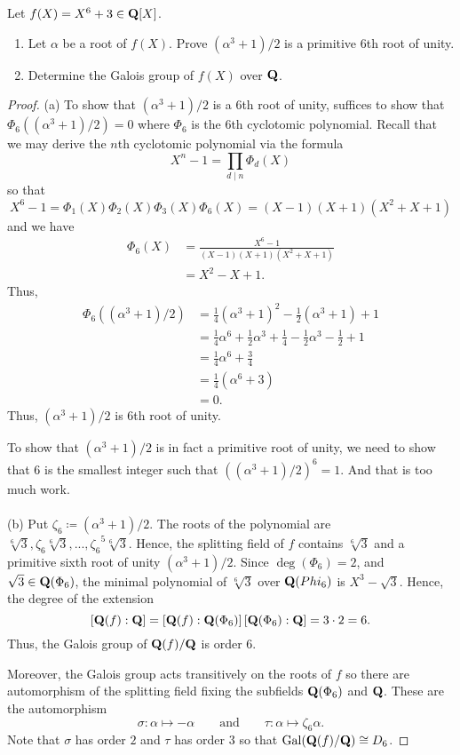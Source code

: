 \begin{problem}
Let $f(X)=X^6+3\in\mathbf{Q}[X]$.
\begin{enumerate}[label=(\alph*)]
\item Let $\alpha$ be a root of $f(X)$. Prove $(\alpha^3+1)/2$ is a
  primitive 6th root of unity.
\item Determine the Galois group of $f(X)$ over $\mathbf{Q}$.
\end{enumerate}
\end{problem}
\begin{proof}
(a) To show that $(\alpha^3+1)/2$ is a $6$th root of unity, suffices to
show that $\Phi_6((\alpha^3+1)/2)=0$ where $\Phi_6$ is the $6$th cyclotomic
polynomial. Recall that we may derive the $n$th cyclotomic polynomial via
the formula
\[
X^n-1=\prod_{d\mid n}\Phi_d(X)
\]
so that
\[
X^6-1=\Phi_1(X)\Phi_2(X)\Phi_3(X)\Phi_6(X)=(X-1)(X+1)(X^2+X+1)
\]
and we have
\begin{align*}
\Phi_6(X)&=\frac{X^6-1}{(X-1)(X+1)(X^2+X+1)}\\
         &=X^2-X+1.
\end{align*}
Thus,
\begin{align*}
\Phi_6((\alpha^3+1)/2)
&=\tfrac{1}{4}(\alpha^3+1)^2-\tfrac{1}{2}(\alpha^3+1)+1\\
&=\tfrac{1}{4}\alpha^6+\tfrac{1}{2}\alpha^3+\tfrac{1}{4}
  -\tfrac{1}{2}\alpha^3-\tfrac{1}{2}+1\\
&=\tfrac{1}{4}\alpha^6+\tfrac{3}{4}\\
&=\tfrac{1}{4}(\alpha^6+3)\\
&=0.
\end{align*}
Thus, $(\alpha^3+1)/2$ is $6$th root of unity.

To show that $(\alpha^3+1)/2$ is in fact a primitive root of unity, we need
to show that $6$ is the smallest integer such that
$((\alpha^3+1)/2)^6=1$. And that is too much work.
\\\\
(b) Put $\zeta_6\coloneqq(\alpha^3+1)/2$. The roots of the polynomial
are $\sqrt[6]{3},\zeta_6\sqrt[6]{3},...,{\zeta_6}^5\sqrt[6]{3}$. Hence, the
splitting field of $f$ contains $\sqrt[6]{3}$ and a primitive sixth root of
unity $(\alpha^3+1)/2$. Since $\deg(\Phi_6)=2$, and
$\sqrt{3}\in\mathbf{Q}(\Phi_6)$, the minimal polynomial of $\sqrt[6]{3}$ over
$\mathbf{Q}(Phi_6)$ is $X^3-\sqrt{3}$. Hence, the degree of the extension
\[
\left[\mathbf{Q}(f):\mathbf{Q}\right]=\left[\mathbf{Q}(f):\mathbf{Q}(\Phi_6)\right]\left[\mathbf{Q}(\Phi_6):\mathbf{Q}\right]=3\cdot 2=6.
\]
Thus, the Galois group of $\mathbf{Q}(f)/\mathbf{Q}$ is order $6$.

Moreover, the Galois group acts transitively on the roots of $f$ so there
are automorphism of the splitting field fixing the subfields $\mathbf{Q}(\Phi_6)$
and $\mathbf{Q}$. These are the automorphism
\[
\sigma\colon\alpha\mapsto-\alpha\qquad\text{and}\qquad\tau\colon\alpha\mapsto\zeta_6\alpha.
\]
Note that $\sigma$ has order $2$ and $\tau$ has order $3$ so that
$\operatorname{Gal}(\mathbf{Q}(f)/\mathbf{Q})\cong D_6$.
\end{proof}

